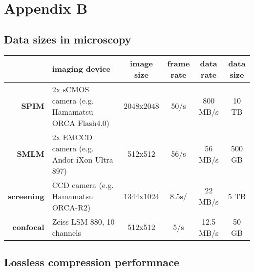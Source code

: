 \chapter{Appendix B}

\setcounter{table}{0}
\renewcommand{\thetable}{B\arabic{table}}

\section*{Data sizes in microscopy}

\begin{table}[tbp]
  \begin{small}
    \renewcommand{\arraystretch}{2}
    \centering
    \begin{tabular}{rp{5cm}cccc}
        & \textbf{imaging device} & \textbf{image size} &  \parbox[c]{1.2cm}{\textbf{frame}\\ \textbf{rate}} & \textbf{data rate} & \parbox[c]{1.2cm}{\textbf{data\\ size}} \\
        \hline
        \hline
        \textbf{SPIM} & 2x sCMOS camera (e.g. Hamamatsu ORCA Flash4.0) & 2048x2048 & 50/s & 800 MB/s & 10 TB \\ \hline
        \textbf{SMLM} & 2x EMCCD camera (e.g. Andor iXon Ultra 897) & 512x512 & 56/s & 56 MB/s & 500 GB \\ \hline
        \textbf{screening} & CCD camera (e.g. Hamamatsu ORCA-R2) & 1344x1024 & 8.5s/ & 22 MB/s & 5 TB \\ \hline
        \textbf{confocal} & Zeiss LSM 880, 10 channels & 512x512 & 5/s & 12.5 MB/s & 50 GB \\ 
    \end{tabular}
    \label{tab:sizes}
  \end{small}
\end{table}


  
\section*{Lossless compression performnace}

